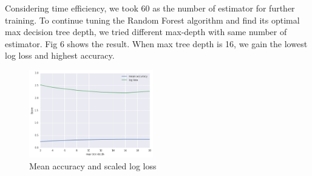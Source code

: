 \documentclass[11pt,conference]{IEEEtran}
\begin{document}
Considering time efficiency, we took 60 as the number of estimator for further training. To continue tuning the Random Forest algorithm and find its optimal max decision tree depth, we tried different max-depth with same number of estimator. Fig 6 shows the result. When max tree depth is 16, we gain the lowest log loss and highest accuracy.
\begin{figure}[H]
\begin{center}
\includegraphics [width=0.48\textwidth]{pics/rf_p2.png}
\caption{Mean accuracy and scaled log loss}
\end{center}
\end{figure}
\end{document}
